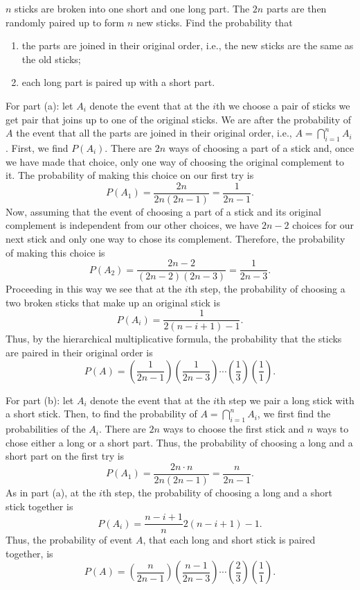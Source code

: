 \begin{problem}[Handout 3, \# 3]
  \(n\) sticks are broken into one short and one long part. The \(2n\)
  parts are then randomly paired up to form \(n\) new sticks. Find the
  probability that
  \begin{enumerate}[label=(\alph*),noitemsep]
  \item the parts are joined in their original order, i.e., the new sticks
    are the same as the old sticks;
  \item each long part is paired up with a short part.
  \end{enumerate}
\end{problem}
\begin{solution}
  For part (a): let \(A_i\) denote the event that at the \(i\)th we choose
  a pair of sticks we get pair that joins up to one of the original
  sticks. We are after the probability of \(A\) the event that all the
  parts are joined in their original order, i.e.,
  \(A=\bigcap_{i=1}^n A_i\). First, we find \(P(A_i)\). There are \(2n\)
  ways of choosing a part of a stick and, once we have made that choice,
  only one way of choosing the original complement to it. The probability
  of making this choice on our first try is
  \[
    P(A_1)=\frac{2n}{2n(2n-1)}=\frac{1}{2n-1}.
  \]
  Now, assuming that the event of choosing a part of a stick and its
  original complement is independent from our other choices, we have
  \(2n-2\) choices for our next stick and only one way to chose its
  complement. Therefore, the probability of making this choice is
  \[
    P(A_2)=\frac{2n-2}{(2n-2)(2n-3)}=\frac{1}{2n-3}.
  \]
  Proceeding in this way we see that at the \(i\)th step, the probability
  of choosing a two broken sticks that make up an original stick is
  \[
    P(A_i)=\frac{1}{2(n-i+1)-1}.
  \]
  Thus, by the hierarchical multiplicative formula, the probability that
  the sticks are paired in their original order is
  \[
    P(A)=\left(\frac{1}{2n-1}\right)\left(\frac{1}{2n-3}\right) \dotsm
    \left(\frac{1}{3}\right)\left(\frac{1}{1}\right).
  \]

  For part (b): let \(A_i\) denote the event that at the \(i\)th step we
  pair a long stick with a short stick. Then, to find the probability of
  \(A=\bigcap_{i=1}^n A_i\), we first find the probabilities of the
  \(A_i\). There are \(2n\) ways to choose the first stick and \(n\) ways
  to chose either a long or a short part. Thus, the probability of choosing
  a long and a short part on the first try is
  \[
    P(A_1)=\frac{2n\cdot n}{2n(2n-1)}=\frac{n}{2n-1}.
  \]
  As in part (a), at the \(i\)th step, the probability of choosing a long
  and a short stick together is
  \[
    P(A_i)=\frac{n-i+1}n{2(n-i+1)-1}.
  \]
  Thus, the probability of event \(A\), that each long and short stick is
  paired together, is
  \[
    P(A)=\left(\frac{n}{2n-1}\right)\left(\frac{n-1}{2n-3}\right)\dotsm
    \left(\frac{2}{3}\right)\left(\frac{1}{1}\right).
  \]
\end{solution}
\newpage

